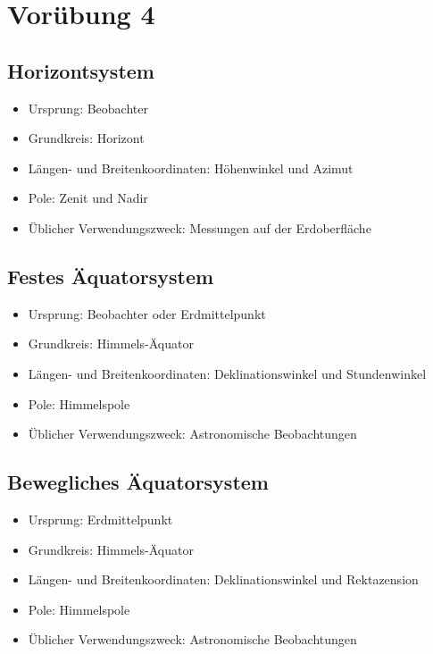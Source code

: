 \documentclass[titlepage]{scrartcl}
\begin{document}
\newpage

\section{Vorübung 4}
\subsection{Horizontsystem}

\begin{itemize}
\item Ursprung: Beobachter
\item Grundkreis: Horizont
\item Längen- und Breitenkoordinaten: Höhenwinkel und Azimut
\item Pole: Zenit und Nadir
\item Üblicher Verwendungszweck: Messungen auf der Erdoberfläche
\end{itemize}

\subsection{Festes Äquatorsystem}

\begin{itemize}
\item Ursprung: Beobachter oder Erdmittelpunkt
\item Grundkreis: Himmels-Äquator
\item Längen- und Breitenkoordinaten: Deklinationswinkel und Stundenwinkel
\item Pole: Himmelspole
\item Üblicher Verwendungszweck: Astronomische Beobachtungen
\end{itemize}

\subsection{Bewegliches Äquatorsystem}

\begin{itemize}
\item Ursprung: Erdmittelpunkt
\item Grundkreis: Himmels-Äquator
\item Längen- und Breitenkoordinaten: Deklinationswinkel und Rektazension
\item Pole: Himmelspole
\item Üblicher Verwendungszweck: Astronomische Beobachtungen
\end{itemize}
\end{document}
